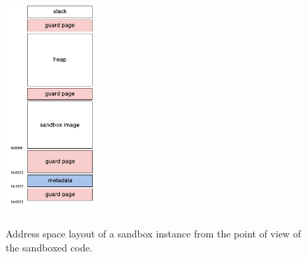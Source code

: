 \documentclass[a4paper,12pt,twoside,openright]{report}
\begin{document}

\begin{figure}
	\centering
	\includegraphics[width=0.3\textwidth]{dia_address_layout.pdf}
	\label{fig:AddressSpaceLayout}
	\caption{Address space layout of a sandbox instance from the point of view of the sandboxed code.}
\end{figure}
\end{document}
